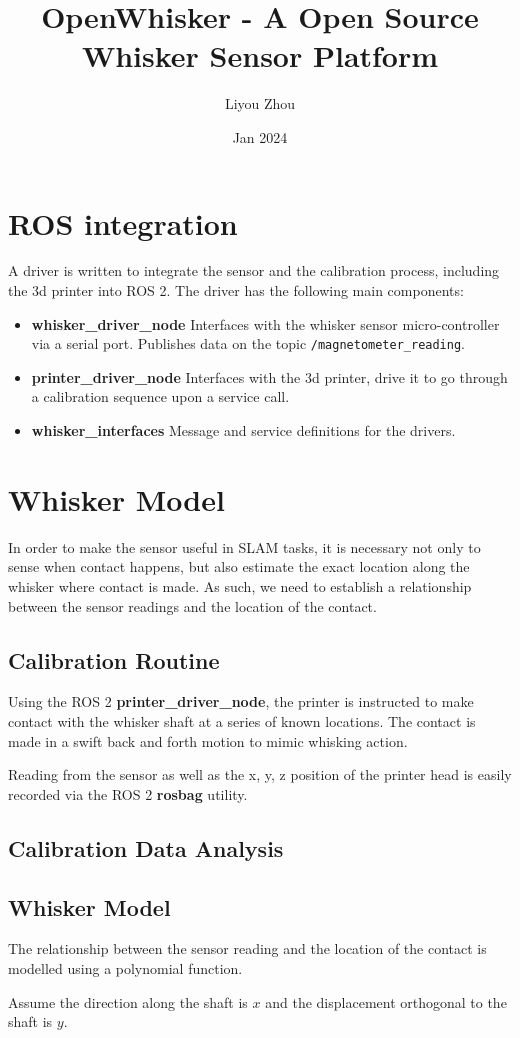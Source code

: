 \documentclass{article}
\title{OpenWhisker - A Open Source Whisker Sensor Platform}
\author{Liyou Zhou}
\date{Jan 2024}
\begin{document}
\maketitle

\section{ROS integration}

A driver is written to integrate the sensor and the calibration process, including the 3d printer into ROS 2.
The driver has the following main components:

\begin{itemize}
    \item \textbf{whisker\_driver\_node} Interfaces with the whisker sensor micro-controller via a serial port.
Publishes data on the topic \verb|/magnetometer_reading|.
    \item  \textbf{printer\_driver\_node} Interfaces with the 3d printer, drive it to go through a calibration sequence
upon a service call.
    \item \textbf{whisker\_interfaces} Message and service definitions for the drivers.
\end{itemize}

\section{Whisker Model}

In order to make the sensor useful in SLAM tasks, it is necessary not  only to sense when contact happens, but also estimate the exact location along the whisker where contact is made. As such, we need to establish a relationship between the sensor readings and the location of the contact.

\subsection{Calibration Routine}

Using the ROS 2 \textbf{printer\_driver\_node}, the printer is instructed to make contact with the whisker shaft at a series of known locations. The contact is made in a swift back and forth motion to mimic whisking action.

Reading from the sensor as well as the x, y, z position of the printer head is easily recorded via the ROS 2 \textbf{rosbag} utility.

\subsection{Calibration Data Analysis}

\subsection{Whisker Model}

The relationship between the sensor reading and the location of the contact is modelled using a polynomial function.

Assume the direction along the shaft is \(x\) and the displacement orthogonal to the shaft is \(y\).
\end{document}
